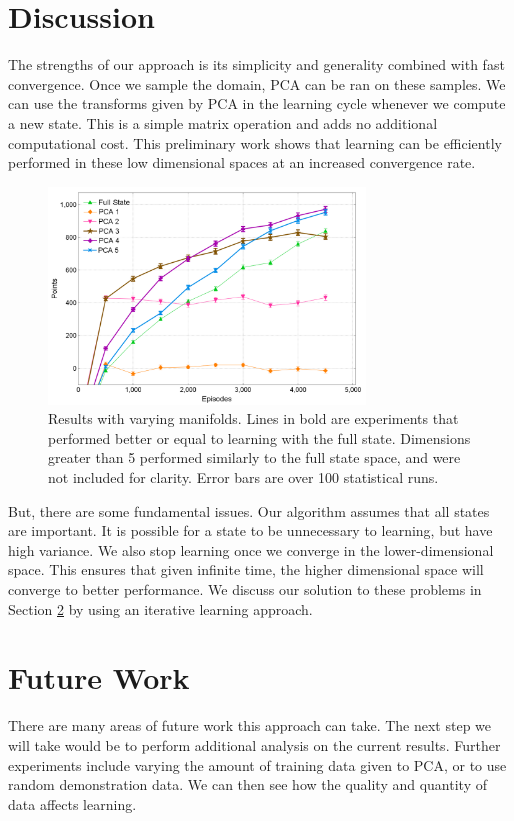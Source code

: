 \documentclass[twoside,11pt]{article}
\begin{document}
\section{Discussion}
The strengths of our approach is its simplicity and generality combined with fast convergence. Once we sample the domain, PCA can be ran on these samples. We can use the transforms given by PCA in the learning cycle whenever we compute a new state. This is a simple matrix operation and adds no additional computational cost. This preliminary work shows that learning can be efficiently performed in these low dimensional spaces at an increased convergence rate. 

\begin{figure}[h!]
  \centering
      \includegraphics[width=0.75\textwidth]{PCA_Results}
  \caption{Results with varying manifolds. Lines in bold are experiments that performed better or equal to learning with the full state. Dimensions greater than 5 performed similarly to the full state space, and were not included for clarity. Error bars are over 100 statistical runs.}
  \label{fig:pca_results}
\end{figure}

But, there are some fundamental issues. Our algorithm assumes that all states are important. It is possible for a state to be unnecessary to learning, but have high variance. We also stop learning once we converge in the lower-dimensional space. This ensures that given infinite time, the higher dimensional space will converge to better performance. We discuss our solution to these problems in Section \ref{Future Work} by using an iterative learning approach. 

\section{Future Work}
\label{Future Work}
There are many areas of future work this approach can take. The next step we will take would be to perform additional analysis on the current results. Further experiments include varying the amount of training data given to PCA, or to use random demonstration data. We can then see how the quality and quantity of data affects learning.
\end{document}
